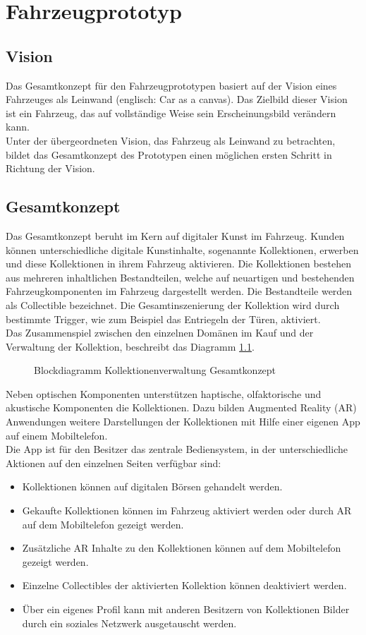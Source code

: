 \chapter{Fahrzeugprototyp}
\label{cha:Prototyp}
\section{Vision}
Das Gesamtkonzept für den Fahrzeugprototypen basiert auf der Vision eines \glqq Fahrzeuges als Leinwand\grqq{} (englisch: \glqq Car as a canvas\grqq{}). Das Zielbild dieser Vision ist ein Fahrzeug, das auf vollständige Weise sein Erscheinungsbild verändern kann. \\
Unter der übergeordneten Vision, das Fahrzeug als Leinwand zu betrachten, bildet das Gesamtkonzept des Prototypen einen möglichen ersten Schritt in Richtung der Vision.
\section{Gesamtkonzept}
Das Gesamtkonzept beruht im Kern auf digitaler Kunst im Fahrzeug. Kunden können unterschiedliche digitale Kunstinhalte, sogenannte Kollektionen, erwerben und diese Kollektionen in ihrem Fahrzeug aktivieren. Die Kollektionen bestehen aus mehreren inhaltlichen Bestandteilen, welche auf neuartigen und bestehenden Fahrzeugkomponenten im Fahrzeug dargestellt werden. Die Bestandteile werden als \glqq Collectible\grqq{} bezeichnet. Die Gesamtinszenierung der Kollektion wird durch bestimmte Trigger, wie zum Beispiel das Entriegeln der Türen, aktiviert. \\
Das Zusammenspiel zwischen den einzelnen Domänen im Kauf und der Verwaltung der Kollektion, beschreibt das Diagramm \ref{fig:gesamtkonzept}.
\begin{figure}[hbt]
	\centering
	
	\caption[Blockdiagramm Kollektionenverwaltung Gesamtkonzept]{Blockdiagramm Kollektionenverwaltung Gesamtkonzept}
	\label{fig:gesamtkonzept}
\end{figure}
Neben optischen Komponenten unterstützen haptische, olfaktorische und akustische Komponenten die Kollektionen. Dazu bilden Augmented Reality (AR) Anwendungen weitere Darstellungen der Kollektionen mit Hilfe einer eigenen App auf einem Mobiltelefon.\\
Die App ist für den Besitzer das zentrale Bediensystem, in der unterschiedliche Aktionen auf den einzelnen Seiten verfügbar sind:
\begin{itemize}
	\item Kollektionen können auf digitalen Börsen gehandelt werden.
	\item Gekaufte Kollektionen können im Fahrzeug aktiviert werden oder durch AR auf dem Mobiltelefon gezeigt werden.
	\item Zusätzliche AR Inhalte zu den Kollektionen können auf dem Mobiltelefon gezeigt werden.
	\item Einzelne Collectibles der aktivierten Kollektion können deaktiviert werden.
	\item Über ein eigenes Profil kann mit anderen Besitzern von Kollektionen Bilder durch ein soziales Netzwerk ausgetauscht werden.
\end{itemize}
